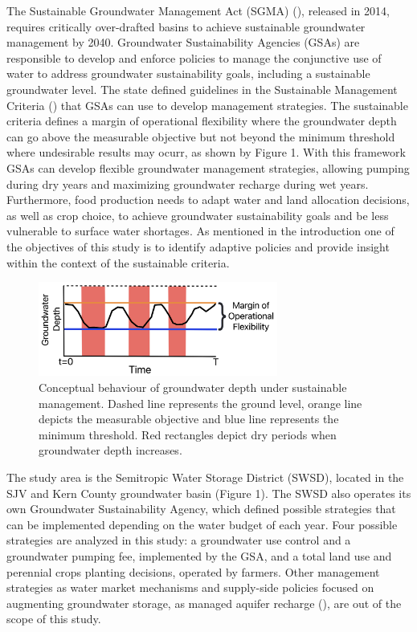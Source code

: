 \documentclass[11pt,a4paper]{article}
\begin{document}
 The Sustainable Groundwater Management Act (SGMA) (\cite{dwr_sustainable_2021}), released in 2014, requires critically over-drafted basins to achieve sustainable groundwater management by 2040. Groundwater Sustainability Agencies (GSAs) are responsible to develop and enforce policies to manage the conjunctive use of water to address groundwater sustainability goals, including a sustainable groundwater level. The state defined  guidelines in the Sustainable Management Criteria (\cite{dwr_sustainable_2017}) that GSAs can use to develop management strategies. The sustainable criteria defines a margin of operational flexibility where the groundwater depth can go above the measurable objective but not beyond the minimum threshold where undesirable results may ocurr, as shown by Figure 1. With this framework GSAs can develop flexible groundwater management strategies, allowing pumping during dry years and maximizing groundwater recharge during wet years. Furthermore, food production needs to adapt water and land allocation decisions, as well as crop choice, to achieve groundwater sustainability goals and be less vulnerable to surface water shortages. As mentioned in the introduction one of the objectives of this study is to identify adaptive policies and provide insight within the context of the sustainable criteria.

 \begin{figure}[H]
    \centering
    \includegraphics[width=0.7\textwidth]{conceptual_sgma_policy.jpg}
    \caption{Conceptual behaviour of groundwater depth under sustainable management. Dashed line represents the ground level, orange line depicts the measurable objective and blue line represents the minimum threshold. Red rectangles depict dry periods when groundwater depth increases.}
    \label{fig:1}
\end{figure}
  
The study area is the Semitropic Water Storage District (SWSD), located in the SJV and Kern County groundwater basin (Figure 1). The SWSD also operates its own Groundwater Sustainability Agency, which defined possible strategies that can be implemented depending on the water budget of each year. Four possible strategies are analyzed in this study: a groundwater use control and a groundwater pumping fee, implemented by the GSA, and a total land use and perennial crops planting decisions, operated by farmers. Other management strategies as water market mechanisms and supply-side policies focused on augmenting groundwater storage, as managed aquifer recharge (\cite{ulibarri_assessing_2021}), are out of the scope of this study. 
\end{document}
